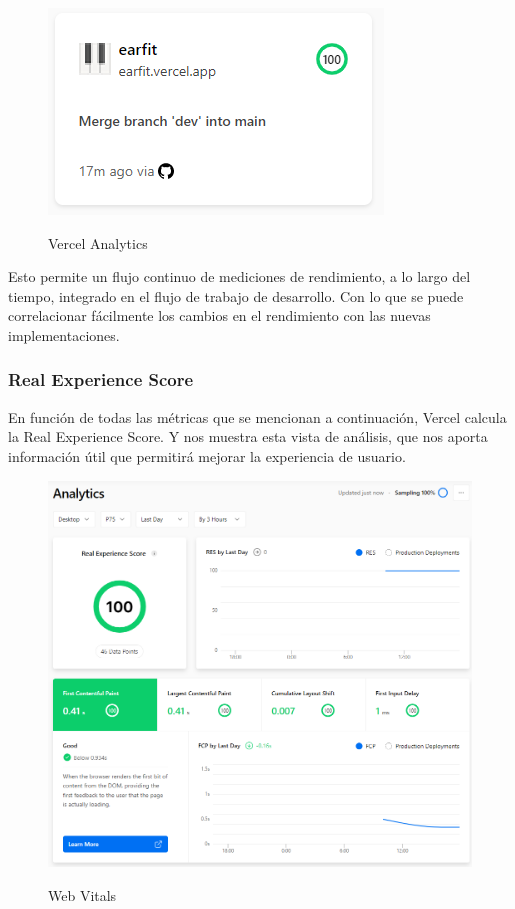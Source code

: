\documentclass[12pt,twoside,titlepage]{report}
\begin{document}
\begin{figure}[H]
    \centering
    \includegraphics[scale=0.8]{Vercel/VercelAnalyticsResume}
    \label{fig:Vercel_metrics_resume}
    \caption{Vercel Analytics}
\end{figure}

Esto permite un flujo continuo de mediciones de rendimiento, a lo largo del tiempo, integrado en el flujo de trabajo de desarrollo. Con lo que se puede correlacionar fácilmente los cambios en el rendimiento con las nuevas implementaciones.

\subsubsection{Real Experience Score}

En función de todas las métricas que se mencionan a continuación, Vercel calcula la Real Experience Score. Y nos muestra esta vista de análisis, que nos aporta información útil que permitirá mejorar la experiencia de usuario.

\begin{figure}[H]
    \centering
    \includegraphics[scale=0.5]{Vercel/RealExperienceScore}
    \label{fig:Vercel_metrics}
    \caption{Web Vitals}
\end{figure}
\end{document}

